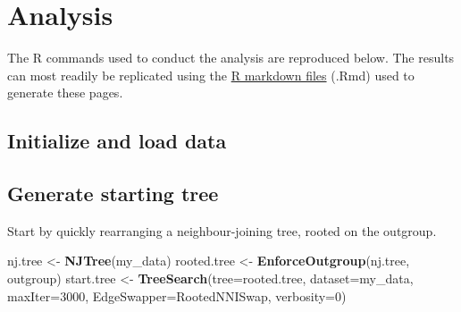 \documentclass[openany]{book}
\newenvironment{Shaded}{\begin{snugshade}}{\end{snugshade}}
\newcommand{\KeywordTok}[1]{\textcolor[rgb]{0.13,0.29,0.53}{\textbf{#1}}}
\newcommand{\DataTypeTok}[1]{\textcolor[rgb]{0.13,0.29,0.53}{#1}}
\newcommand{\DecValTok}[1]{\textcolor[rgb]{0.00,0.00,0.81}{#1}}
\newcommand{\FloatTok}[1]{\textcolor[rgb]{0.00,0.00,0.81}{#1}}
\newcommand{\StringTok}[1]{\textcolor[rgb]{0.31,0.60,0.02}{#1}}
\newcommand{\CommentTok}[1]{\textcolor[rgb]{0.56,0.35,0.01}{\textit{#1}}}
\newcommand{\OtherTok}[1]{\textcolor[rgb]{0.56,0.35,0.01}{#1}}
\newcommand{\OperatorTok}[1]{\textcolor[rgb]{0.81,0.36,0.00}{\textbf{#1}}}
\newcommand{\NormalTok}[1]{#1}
\theoremstyle{definition}
\theoremstyle{definition}
\theoremstyle{definition}
\theoremstyle{remark}
\begin{document}
\section{Analysis}\label{analysis}

The R commands used to conduct the analysis are reproduced below. The
results can most readily be replicated using the
\href{https://github.com/ms609/hyoliths/}{R markdown files} (.Rmd) used
to generate these pages.

\subsection{Initialize and load data}\label{initialize-and-load-data}

\begin{Shaded}
\end{Shaded}

\subsection{Generate starting tree}\label{generate-starting-tree}

Start by quickly rearranging a neighbour-joining tree, rooted on the
outgroup.

\begin{Shaded}
\begin{Highlighting}[]
\NormalTok{nj.tree <-}\StringTok{ }\KeywordTok{NJTree}\NormalTok{(my_data)}
\NormalTok{rooted.tree <-}\StringTok{ }\KeywordTok{EnforceOutgroup}\NormalTok{(nj.tree, outgroup)}
\NormalTok{start.tree <-}\StringTok{ }\KeywordTok{TreeSearch}\NormalTok{(}\DataTypeTok{tree=}\NormalTok{rooted.tree, }\DataTypeTok{dataset=}\NormalTok{my_data, }\DataTypeTok{maxIter=}\DecValTok{3000}\NormalTok{,}
                         \DataTypeTok{EdgeSwapper=}\NormalTok{RootedNNISwap, }\DataTypeTok{verbosity=}\DecValTok{0}\NormalTok{)}
\end{Highlighting}
\end{Shaded}
\end{document}

